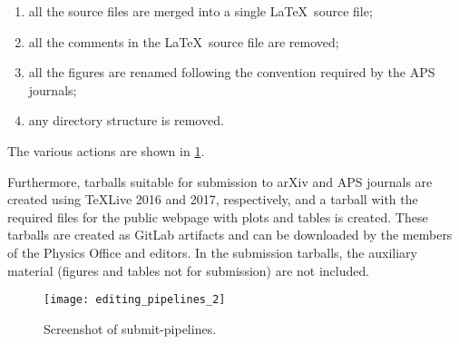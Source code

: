 \begin{enumerate}
\item all the source files are merged into a single \LaTeX\ source file;
\item all the comments in the \LaTeX\ source file are removed;
\item all the figures are renamed following the convention required by the APS journals;
\item any directory structure is removed.
\end{enumerate}
The various actions are shown in \cref{fig:submit-pipelines}.

Furthermore, tarballs suitable for submission to arXiv and APS journals are created using \TeX{}Live 2016 and 2017, respectively, and a tarball with the required files for the public webpage with plots and tables is created. These tarballs are created as GitLab artifacts and can be downloaded by the members of the Physics Office and editors. In the submission tarballs, the auxiliary material (figures and tables not for submission) are not included.

\begin{figure}[htb]
  \centering
  \texttt{[image: editing\_pipelines\_2]}
  \caption{Screenshot of submit-pipelines.}%
  \label{fig:submit-pipelines}
\end{figure}


